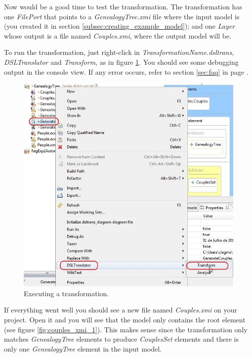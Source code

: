 Now would be a good time to test the transformation. The transformation has one
\emph{FilePort} that points to a \emph{GenealogyTree.xmi} file where the input
model is (you created it in section \ref{subsec:creating_example_model}); and
one \emph{Layer} whose output is a file named \emph{Couples.xmi}, where the
output model will be.

To run the transformation, just right-click in
\emph{TransformationName.dsltrans}, \emph{DSLTranslator} and
\emph{Transform}, as in figure \ref{fig:transform_dsltrans}. You should see some
debugging output in the console view. If any error occurs, refer to section
\ref{sec:faq} in page \pageref{sec:faq}.

\begin{figure}[h]
\begin{center}
  \includegraphics[scale=0.7]{imgs/transform_dsltrans.jpg}
  \caption{Executing a transformation.}
  \label{fig:transform_dsltrans}
\end{center}
\end{figure}

If everything went well you should see a new file named \emph{Couples.xmi} on
your project. Open it and you will see that the model only contains the root
element (see figure \ref{fig:couples_xmi_1}). This makes sense since the
transformation only matches \emph{GenealogyTree} elements to produce
\emph{CouplesSet} elements and there is only one \emph{GenealogyTree} element in
the input model.

